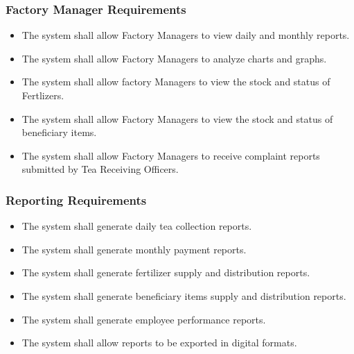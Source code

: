 \subsubsection{Factory Manager Requirements}
\begin{itemize}
    \item The system shall allow Factory Managers to view daily and monthly reports.
    \item The system shall allow Factory Managers to analyze charts and graphs.
    \item The system shall allow factory Managers to view the stock and status of Fertlizers.
    \item The system shall allow Factory Managers to view the stock and status of beneficiary items.
    \item The system shall allow Factory Managers to receive complaint reports submitted by Tea Receiving Officers.
\end{itemize}

\subsubsection{Reporting Requirements}
\begin{itemize}
    \item The system shall generate daily tea collection reports.
    \item The system shall generate monthly payment reports.
    \item The system shall generate fertilizer supply and distribution reports.
    \item The system shall generate beneficiary items supply and distribution reports.
    \item The system shall generate employee performance reports.
    \item The system shall allow reports to be exported in digital formats.
\end{itemize}

